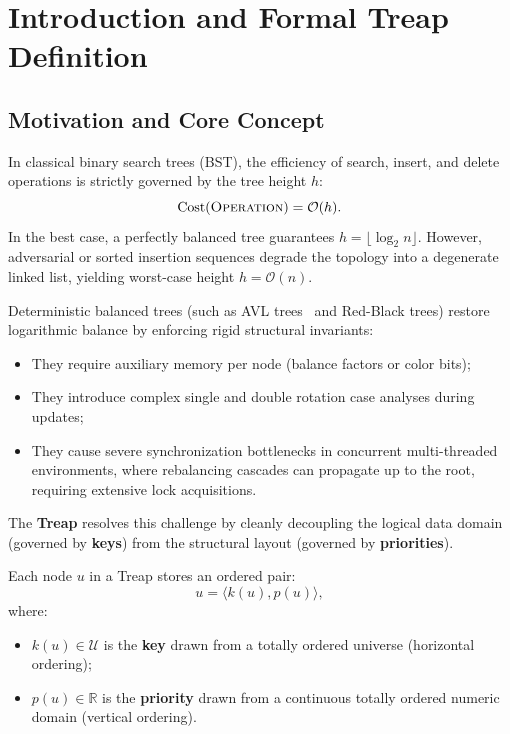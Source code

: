 \FloatBarrier
\section{Introduction and Formal Treap Definition}
\label{sec:treap-definition-and-foundations-en}

\subsection{Motivation and Core Concept}
In classical binary search trees (BST), the efficiency of search, insert, and delete operations is strictly governed by the tree height $h$:
\begin{equation}
  \operatorname{Cost}(\textsc{Operation}) = \mathcal{O}(h).
\end{equation}
In the best case, a perfectly balanced tree guarantees $h = \lfloor \log_2 n \rfloor$. However, adversarial or sorted insertion sequences degrade the topology into a degenerate linked list, yielding worst-case height $h = \mathcal{O}(n)$.

Deterministic balanced trees (such as AVL trees~\cite{knuth1997} and Red-Black trees) restore logarithmic balance by enforcing rigid structural invariants:
\begin{itemize}
    \item They require auxiliary memory per node (balance factors or color bits);
    \item They introduce complex single and double rotation case analyses during updates;
    \item They cause severe synchronization bottlenecks in concurrent multi-threaded environments, where rebalancing cascades can propagate up to the root, requiring extensive lock acquisitions.
\end{itemize}

The \textbf{Treap} resolves this challenge by cleanly decoupling the logical data domain (governed by \textbf{keys}) from the structural layout (governed by \textbf{priorities}).

\begin{definition}
Each node $u$ in a Treap stores an ordered pair:
\begin{equation}
  u = \langle k(u), p(u) \rangle,
\end{equation}
where:
\begin{itemize}
    \item $k(u) \in \mathcal{U}$ is the \textbf{key} drawn from a totally ordered universe (horizontal ordering);
    \item $p(u) \in \mathbb{R}$ is the \textbf{priority} drawn from a continuous totally ordered numeric domain (vertical ordering).
\end{itemize}
\end{definition}

